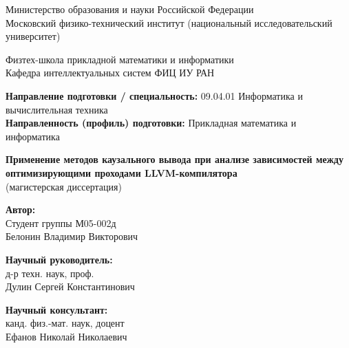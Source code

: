 \begin{center}

    Министерство образования и науки Российской Федерации \\
    Московский физико-технический институт (национальный исследовательский университет) \\

    \vspace{0.5em}

    Физтех-школа прикладной математики и информатики \\

    Кафедра интеллектуальных систем ФИЦ ИУ РАН \\

    \vspace{0.5em}

\end{center}

\begin{flushleft}

    \textbf{Направление подготовки / специальность:} 09.04.01 Информатика и вычислительная техника \\
    \textbf{Направленность (профиль) подготовки:} Прикладная математика и информатика \\

\end{flushleft}

\begin{center}

    \vspace{\fill}

    \large\textbf{Применение методов каузального вывода при анализе зависимостей между оптимизирующими проходами LLVM-компилятора} \\

    (магистерская диссертация)

    \vspace{\fill}

\end{center}

\begin{flushright}

    \textbf{Автор:} \\
    Студент группы М05-002д \\
    Белонин Владимир Викторович \\

    \vspace{1.5em}

    \textbf{Научный руководитель:} \\
    д-р техн. наук, проф. \\
    Дулин Сергей Константинович \\

    \vspace{1.0em}

    \textbf{Научный консультант:} \\
    канд. физ.-мат. наук, доцент \\
    Ефанов Николай Николаевич \\

\end{flushright}

